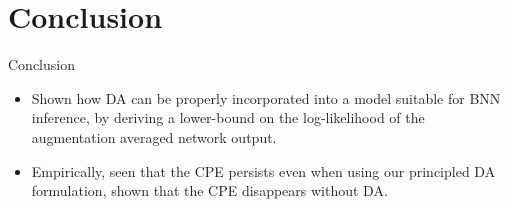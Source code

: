\documentclass[10pt, handout, envcountsect]{beamer} %
\begin{document}
\section{Conclusion}

\begin{frame}{Conclusion}
\begin{itemize}
    \item  Shown how DA can be properly incorporated into
a model suitable for BNN inference, by deriving
a lower-bound on the log-likelihood of the augmentation averaged network output.

\vspace{10pt}

    \item Empirically, seen that the
CPE persists even when using our principled DA formulation, shown that the CPE disappears without DA.
\end{itemize}
\end{frame}
\end{document}
